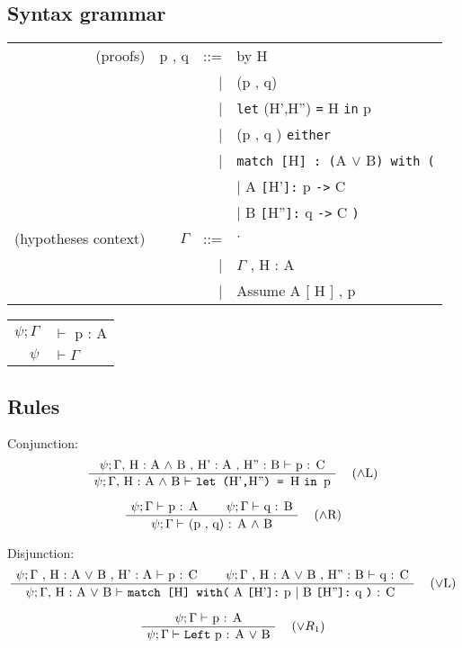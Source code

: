 \documentclass[twoside,a4paper]{article}
\begin{document}
\subsection{Syntax grammar}
\begin{center}
\begin{tabular}{rrrl}
(proofs)& p , q &::=& by H 
\\ &&|& (p , q) 
\\ &&|& {\tt let} (H',H'') {\tt =} H {\tt in} p
\\ &&|& (p , q ) {\tt either} 
\\ &&|& {\tt match [}H{\tt  ] : (}A $\vee$ B{\tt ) with (}
\\ &&&\qquad \qquad | A {\tt [}H'{\tt ]:} p {\tt ->} C 
\\ &&&\qquad \qquad | B {\tt [}H''{\tt ]:} q {\tt ->} C {\tt)}
\\
(hypotheses context)& $\Gamma$ &::=& \quad $\cdot$ \quad 
\\ &&| & $\Gamma$ , H : A
\\ &&| & Assume A [ H ] , p
\end{tabular}

\begin{tabular} {rl}
$\psi ; \Gamma$ &$\vdash$ p : A
\\
$\psi $ & $\vdash \Gamma$
\end{tabular}
\end{center}

\subsection{Rules}
Conjunction:
\[
\AxiomC{$\psi ; \Gamma ,$ H : A $\wedge$ B , H' : A , H'' : B 
$\vdash$ p : C}
\RightLabel{\quad ($\wedge$L)}
\UnaryInfC{$\psi ; \Gamma ,$ H : A $\wedge$ B $\vdash$
{\tt let (}H'{\tt,}H''{\tt) = }H {\tt  in }p}
\DisplayProof
\]

\[
\AxiomC{$\psi ; \Gamma \vdash$ p : A}
\AxiomC{$\psi ; \Gamma \vdash$ q : B}
\RightLabel{\quad ($\wedge$R)}
\BinaryInfC{$\psi ; \Gamma \vdash$ (p , q) : A $\wedge$ B}
\DisplayProof
\]

Disjunction:
\[
\AxiomC{$\psi ; \Gamma$ , H : A $ \vee$ B , H' : A $\vdash$ p : C}
\AxiomC{$\psi ; \Gamma$ , H : A $ \vee$ B , H'' : B $\vdash$ q : C}
\RightLabel{\quad ($\vee$L)}
\BinaryInfC{$\psi ; \Gamma ,$  H : A 
$ \vee$ B $\vdash $
 {\tt  match [}H{\tt] with(}
 A {\tt [}H'{\tt ]:} p
 | B {\tt [}H''{\tt ]:} q {\tt)} : C
}
\DisplayProof
\]

\[
\AxiomC{$\psi ; \Gamma \vdash$ p : A}
\RightLabel{\quad ($\vee R_1$)}
\UnaryInfC{$\psi ; \Gamma \vdash$ {\tt Left} p : A $\vee$ B}
\DisplayProof
\]
\end{document}
